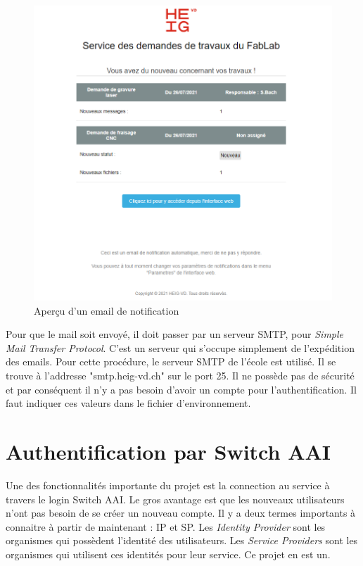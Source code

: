 \documentclass[
    iai, %
    eai, %
]{heig-tb}
\begin{document}
\begin{figure}[h]
  \includegraphics[width=14cm]{email.PNG}
  \caption{Aperçu d'un email de notification}
\end{figure}

Pour que le mail soit envoyé, il doit passer par un serveur SMTP, pour \emph{Simple Mail Transfer Protocol}. C'est un serveur qui s'occupe simplement de l'expédition des emails.
Pour cette procédure, le serveur SMTP de l'école est utilisé. Il se trouve à l'addresse "smtp.heig-vd.ch" sur le port 25. Il ne possède pas de sécurité et par conséquent il n'y a pas besoin d'avoir un compte pour l'authentification. Il faut indiquer ces valeurs dans le fichier d'environnement.

\newpage
\section{Authentification par Switch AAI}
Une des fonctionnalités importante du projet est la connection au service à travers le login Switch AAI. Le gros avantage est que les nouveaux utilisateurs n'ont pas besoin de se créer un nouveau compte. Il y a deux termes importants à connaitre à partir de maintenant : IP et SP. Les \emph{Identity Provider} sont les organismes qui possèdent l'identité des utilisateurs. Les \emph{Service Providers} sont les organismes qui utilisent ces identités pour leur service. Ce projet en est un.
\end{document}
